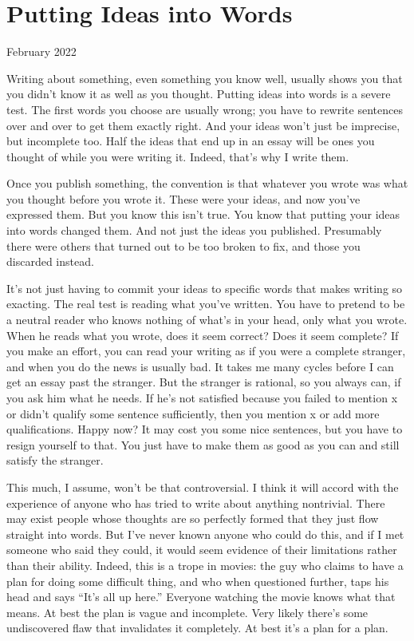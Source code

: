 \chapter{Putting Ideas into Words}

February 2022

Writing about something, even something you know well, usually shows you
that you didn't know it as well as you thought. Putting ideas into words
is a severe test. The first words you choose are usually wrong; you have
to rewrite sentences over and over to get them exactly right. And your
ideas won't just be imprecise, but incomplete too. Half the ideas that
end up in an essay will be ones you thought of while you were writing
it. Indeed, that's why I write them.

Once you publish something, the convention is that whatever you wrote
was what you thought before you wrote it. These were your ideas, and now
you've expressed them. But you know this isn't true. You know that
putting your ideas into words changed them. And not just the ideas you
published. Presumably there were others that turned out to be too broken
to fix, and those you discarded instead.

It's not just having to commit your ideas to specific words that makes
writing so exacting. The real test is reading what you've written. You
have to pretend to be a neutral reader who knows nothing of what's in
your head, only what you wrote. When he reads what you wrote, does it
seem correct? Does it seem complete? If you make an effort, you can read
your writing as if you were a complete stranger, and when you do the
news is usually bad. It takes me many cycles before I can get an essay
past the stranger. But the stranger is rational, so you always can, if
you ask him what he needs. If he's not satisfied because you failed to
mention x or didn't qualify some sentence sufficiently, then you mention
x or add more qualifications. Happy now? It may cost you some nice
sentences, but you have to resign yourself to that. You just have to
make them as good as you can and still satisfy the stranger.

This much, I assume, won't be that controversial. I think it will accord
with the experience of anyone who has tried to write about anything
nontrivial. There may exist people whose thoughts are so perfectly
formed that they just flow straight into words. But I've never known
anyone who could do this, and if I met someone who said they could, it
would seem evidence of their limitations rather than their ability.
Indeed, this is a trope in movies: the guy who claims to have a plan for
doing some difficult thing, and who when questioned further, taps his
head and says ``It's all up here.'' Everyone watching the movie knows
what that means. At best the plan is vague and incomplete. Very likely
there's some undiscovered flaw that invalidates it completely. At best
it's a plan for a plan.

